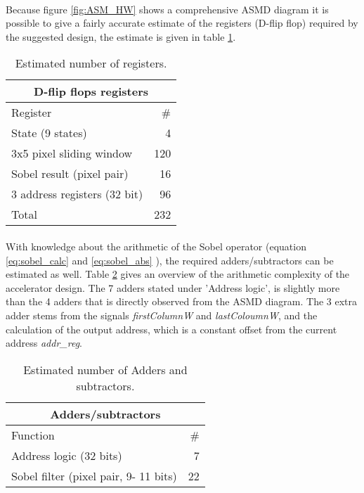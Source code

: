 \paragraph*{}
Because figure \ref{fig:ASM_HW} shows a comprehensive ASMD diagram it is possible to give a fairly accurate estimate of the registers (D-flip flop) required by the suggested design, the estimate is given in table \ref{tab:designRegisters}. 
\begin{table}[h]
	\centering
	\begin{tabular}{lr}
	\hline
	\multicolumn{2}{c}{D-flip flops registers} \\ \hline
	Register						& \# \\ \hline
	State (9 states)				& 4 \\
	3x5 pixel sliding window		& 120 \\
	Sobel result (pixel pair)		& 16 \\
	3 address registers (32 bit)	& 96 \\ \hline
	Total							& 232 \\ \hline
	\end{tabular}
	\caption{Estimated number of registers.}
	\label{tab:designRegisters}
\end{table}

\paragraph*{}
With knowledge about the arithmetic of the Sobel operator (equation \ref{eq:sobel_calc} and \ref{eq:sobel_abs} ), the required adders/subtractors can be estimated as well.
Table \ref{tab:designAdders} gives an overview of the arithmetic complexity of the accelerator design. The 7 adders stated under 'Address logic', is slightly more than the 4 adders that is directly observed from the ASMD diagram.
The 3 extra adder stems from the signals \emph{firstColumnW} and \emph{lastColoumnW}, and the calculation of the output address, which is a constant offset from the current address \emph{addr\_reg}.\\

\begin{table}[h]
	\centering
	\begin{tabular}{lr}
	\hline
	\multicolumn{2}{c}{Adders/subtractors} \\ \hline
	Function						& \# \\ \hline
	Address logic (32 bits)			& 7 \\
	Sobel filter (pixel pair, 9- 11 bits)		& 22 \\  \hline
	\end{tabular}
	\caption{Estimated number of Adders and subtractors.}
	\label{tab:designAdders}
\end{table}


